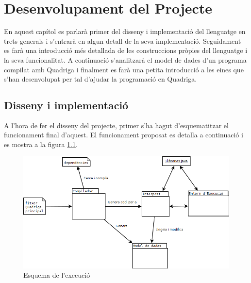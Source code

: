 \chapter{Desenvolupament del Projecte}
\label{chap:Desenvolupament}

En aquest capítol es parlarà primer del disseny i implementació del llenguatge en trets generals i s'entrarà en algun detall de la seva implementació. Seguidament es farà una introducció més detallada de les construccions pròpies del llenguatge i la seva funcionalitat. A continuació s'analitzarà el model de dades d'un programa compilat amb Quadriga i finalment es farà una petita introducció a les eines que s'han desenvolupat per tal d'ajudar la programació en Quadriga.

\section{Disseny i implementació}

  A l'hora de fer el disseny del projecte, primer s'ha hagut d'esquematitzar el funcionament final d'aquest. El funcionament proposat es detalla a continuació i es mostra a la figura \ref{fig:EsquemaExecucio}.
  
  \begin{figure}
    \includegraphics[width=1\linewidth]{./img/EsquemaExecucio.png}
    \caption{Esquema de l'execució \label{fig:EsquemaExecucio}}
  \end{figure}
  
